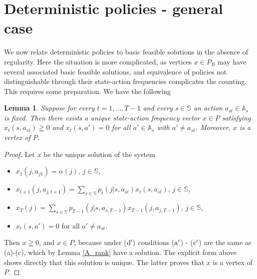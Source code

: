\documentclass{article}
\newtheorem{lemma}[theorem]{Lemma}
\theoremstyle{definition}
\numberwithin{equation}{section}
\begin{document}
\section{Deterministic policies -  general case}
\label{sect_general_case}


We now relate deterministic policies to basic feasible solutions in the absence of regularity. 
Here the situation is more complicated, as
vertices $x\in P_B$ may have several
associated basic feasible solutions, and equivalence
of policies not distinguishable through their state-action frequencies complicates
the counting. This requires some
preparation.  We have the following


\begin{lemma}
\label{lem9}
Suppose for every $t=1,\dots,T-1$ and every $s\in \mathbb{S}$
an action $a_{st}\in \mathbb{A}_s$ is fixed. Then there exists a unique state-action frequency vector
$x\in P$ satisfying $x_t(s,a_{st}) \geqq  0$ and $x_t(s,a')=0$ for all $a'\in \mathbb{A}_s$ with $a'\not=a_{st}$.
Moreover, $x$ is a vertex of $P$. 
\end{lemma}

\begin{proof}
Let $x$ be the unique solution of the system
\begin{itemize}
    \item[(${\rm a}'$)] $x_1(j,a_{j1}) = \alpha(j)$, $j\in \mathbb{S}$,
    \item[(${\rm b}'$)] $x_{t+1}(j,a_{j,t+1}) = \sum_{s\in \mathbb{S}} p_t(j|s,a_{st}) x_t(s,a_{st})$, $j\in \mathbb{S}$,
    \item[(${\rm c}'$)] $x_T(j) = \sum_{s\in \mathbb{S}} p_{T-1}(j|s,a_{s,T-1}) x_{T-1}(j,a_{j,T-1})$, $j\in \mathbb{S}$,
    \item[(${\rm d}'$)] $x_t(s,a')=0$ for all $a'\not=a_{st}$.
\end{itemize}
Then $x\geqq 0$, and $x\in P$, because under (${\rm d}')$ conditions (${\rm a}'$) - (${\rm c}'$)
are the same as (a)-(c), which by Lemma \ref{A_rank} have a solution. The explicit form 
above shows directly that this solution is unique. The latter proves that $x$ is a vertex of $P$.
\end{proof}
\end{document}
